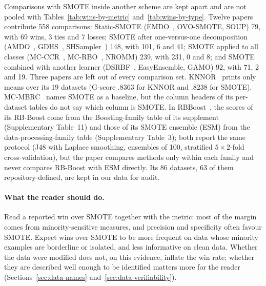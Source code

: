 Comparisons with SMOTE inside another scheme are kept apart and are not pooled with
Tables~\ref{tab:wins-by-metric} and~\ref{tab:wins-by-type}. Twelve papers contribute
558 comparisons: Static-SMOTE (EMDO~, OVO-SMOTE, SOUP) 79, with 69
wins, 3 ties and 7 losses; SMOTE after one-versus-one decomposition (AMDO~, GDHS~,
SHSampler~) 148, with 101, 6 and 41; SMOTE applied to all
classes (MC-CCR~, MC-RBO~, NROMM) 239,
with 231, 0 and 8; and SMOTE combined with another learner (DSRBF~, EasyEnsemble, GAMO) 92,
with 71, 2 and 19. Three papers are left out of every comparison set. KNNOR~
prints only means over its 19 datasets (G-score .8363 for KNNOR and .8238 for SMOTE).
MC-MBRC~ names SMOTE as a baseline, but the column headers of its
per-dataset tables do not say which column is SMOTE. In RBBoost~,
the scores of its RB-Boost come from the Boosting-family table of its supplement
(Supplementary Table~11) and those of its SMOTE ensemble (ESM) from the
data-processing-family table (Supplementary Table~3); both report the same protocol
(J48 with Laplace smoothing, ensembles of 100, stratified $5\times2$-fold
cross-validation), but the paper compares methods only within each family and never
compares RB-Boost with ESM directly. Its 86 datasets, 63 of them repository-defined,
are kept in our data for audit.

\paragraph{What the reader should do.} Read a reported win over SMOTE together with
the metric: most of the margin comes from minority-sensitive measures, and precision
and specificity often favour SMOTE. Expect wins over SMOTE to be more frequent on data
whose minority examples are borderline or isolated, and less informative on clean
data. Whether the data were modified does not, on this evidence, inflate the win
rate; whether they are described well enough to be identified matters more for the
reader (Sections~\ref{sec:data-names} and~\ref{sec:data-verifiability}).

